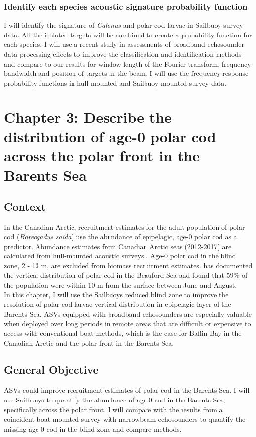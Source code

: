 \documentclass[a4paper, 12pt, Ariel]{article}
\begin{document}
\subsubsection {Identify each species acoustic signature probability function} 
I will identify the signature of \textit{Calanus} and polar cod larvae in Sailbuoy survey data. All the isolated targets will be combined to create a probability function for each species. I will use a recent study in assessments of broadband echosounder data processing effects to improve the classification and identification methods \cite{BenoitBird2020} and compare to our results for window length of the Fourier transform, frequency bandwidth and position of targets in the beam. I will use the frequency response probability functions in hull-mounted and Sailbuoy mounted survey data.




\section{Chapter 3: Describe the distribution of age-0 polar cod across the polar front in the Barents Sea}
\subsection{Context}
In the Canadian Arctic, recruitment estimates for the adult population of polar cod (\textit{Boreogadus saida}) use the abundance of epipelagic, age-0 polar cod as a predictor. Abundance estimates from Canadian Arctic seas (2012-2017) are calculated from hull-mounted acoustic surveys \cite{Bouchard2017, LeBlanc2019}. Age-0 polar cod in the blind zone, 2 - 13 m, are excluded from biomass recruitment estimates.  \cite{Bouchard2016} has documented the vertical distribution of polar cod in the Beauford Sea and found that 59\% of the population were within 10 m from the surface between June and August. \\

In this chapter, I will use the Sailbuoys reduced blind zone to improve the resolution of polar cod larvae vertical distribution in epipelagic layer of the Barents Sea. ASVs equipped with broadband echosounders are especially valuable when deployed over long periods in remote areas that are difficult or expensive to access with conventional boat methods, which is the case for Baffin Bay in the Canadian Arctic and the polar front in the Barents Sea.

\subsection{General Objective}
ASVs could improve recruitment estimates of polar cod in the Barents Sea.  I will use Sailbuoys to quantify the abundance of age-0 cod in the Barents Sea, specifically across the polar front. I will compare with the results from a coincident boat mounted survey with narrowbeam echosounders to quantify the missing age-0 cod in the blind zone and compare methods.
\end{document}
